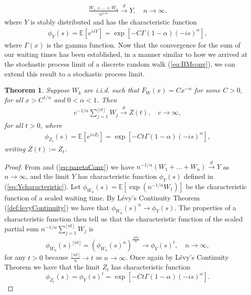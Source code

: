 \documentclass[honours,12pt,twoside, openright]{unswthesis}
\newcommand{\E}{\mathbb{E}}
\newcommand{\1}{\mathbf 1}
\newcommand{\Floor}[1]{{\lfloor {#1} \rfloor}}
\newcommand{\cd}{\overset{d}{\longrightarrow}}
\newtheorem{theorem}[equation]{Theorem}
\numberwithin{equation}{section}
\theoremstyle{definition}
\theoremstyle{remark}
\begin{document}
\begin{align}\label{eq:paretoConv}
	\frac{W_1 + \ldots + W_n}{n^{1/\alpha}} \overset{d}{\longrightarrow} Y, \quad n \to \infty.
\end{align}
\noindent where $Y$ is stably distributed and has the characteristic function
\begin{align}\label{eq:Ycharacteristic}
	\phi_Y(s)=\E[e^{isY}]=\exp[-C\Gamma(1-\alpha)(-is)^\alpha],
\end{align}
\noindent where $\Gamma(x)$ is the gamma function. Now that the convergence for the sum of our waiting times has been established, in a manner similar to how we arrived at the stochastic process limit of a discrete random walk (\ref{eq:BMconv}), we can extend this result to a stochastic process limit.
\begin{theorem}\cite[Th~3.41]{MeerschaertSikorskii2012}
Suppose $W_k$ are i.i.d. such that $\overline F_W(x)=Cx^{-\alpha}$ for some $C>0$, for all $x>C^{1/\alpha}$ and $0<\alpha<1$. Then
\begin{align}\label{eq:partialParetoSum}
	c^{-1/\alpha}\sum\limits^\Floor{ct}_{j=1} W_j \cd Z(t), \quad c \to \infty,
\end{align}
for all $t>0$, where
\begin{align}
	\phi_{Z_t}(s)=\E[e^{isZ_t}]=\exp[-Ct\Gamma(1-\alpha)(-is)^\alpha],
\end{align}
writing $Z(t):=Z_t$.
\end{theorem} 
\begin{proof}
From \cite[Th~3.39]{MeerschaertSikorskii2012} and (\ref{eq:paretoConv}) we have $n^{-1/\alpha}(W_1 + \ldots + W_n) \overset{d}{\longrightarrow} Y$ as $n \to \infty$, and the limit $Y$ has characteristic function $\phi_Y(s)$ defined in (\ref{eq:Ycharacteristic}). Let $\phi_{W_n}(s)=\E[\exp(n^{-1/\alpha}W_1)]$ be the characteristic function of a scaled waiting time. By L\'{e}vy's Continuity Theorem (\ref{def:levyContinuity}) we have that $\phi_{W_n}(s)^n\to \phi_Y(s)$. The properties of a characteristic function then tell us that the characteristic function of the scaled partial sum $n^{-1/\alpha}\sum\limits^\Floor{nt}_{j=1} W_j$ is
\[
	\phi_{W_n}(s)^\Floor{nt}=\left(\phi_{W_n}(s)^n\right)^\frac{\Floor{nt}}{n}\to\phi_Y(s)^t,\quad n \to\infty,
\]
for any $t>0$ because $\frac{\Floor{nt}}{n}\to t$ as $n\to\infty$. Once again by L\'{e}vy's Continuity Theorem we have that the limit $Z_t$ has characteristic function
\[
	\phi_{Z_t}(s)=\phi_Y(s)^t=\exp[-Ct\Gamma(1-\alpha)(-is)^\alpha].
\]
\end{proof}
\end{document}
